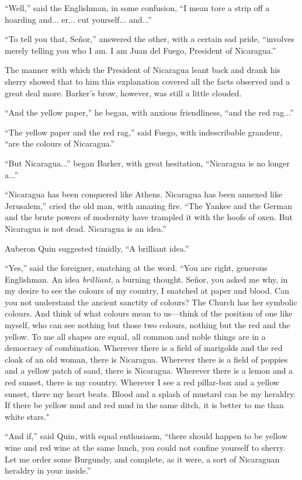 \documentclass{book}
\begin{document}
“Well,” said the Englishman, in some confusion, “I mean tore a strip off a hoarding and... er... cut yourself... and...”

“To tell you that, Señor,” answered the other, with a certain sad pride, “involves merely telling you who I am. I am Juan del Fuego, President of Nicaragua.”

The manner with which the President of Nicaragua leant back and drank his sherry showed that to him this explanation covered all the facts observed and a great deal more. Barker’s brow, however, was still a little clouded.

“And the yellow paper,” he began, with anxious friendliness, “and the red rag...”

“The yellow paper and the red rag,” said Fuego, with indescribable grandeur, “are the colours of Nicaragua.”

“But Nicaragua...” began Barker, with great hesitation, “Nicaragua is no longer a...”

“Nicaragua has been conquered like Athens. Nicaragua has been annexed like Jerusalem,” cried the old man, with amazing fire. “The Yankee and the German and the brute powers of modernity have trampled it with the hoofs of oxen. But Nicaragua is not dead. Nicaragua is an idea.”

Auberon Quin suggested timidly, “A brilliant idea.”

“Yes,” said the foreigner, snatching at the word. “You are right, generous Englishman. An idea \emph{brilliant}, a burning thought. Señor, you asked me why, in my desire to see the colours of my country, I snatched at paper and blood. Can you not understand the ancient sanctity of colours? The Church has her symbolic colours. And think of what colours mean to us—think of the position of one like myself, who can see nothing but those two colours, nothing but the red and the yellow. To me all shapes are equal, all common and noble things are in a democracy of combination. Wherever there is a field of marigolds and the red cloak of an old woman, there is Nicaragua. Wherever there is a field of poppies and a yellow patch of sand, there is Nicaragua. Wherever there is a lemon and a red sunset, there is my country. Wherever I see a red pillar-box and a yellow sunset, there my heart beats. Blood and a splash of mustard can be my heraldry. If there be yellow mud and red mud in the same ditch, it is better to me than white stars."

“And if,” said Quin, with equal enthusiasm, “there should happen to be yellow wine and red wine at the same lunch, you could not confine yourself to sherry. Let me order some Burgundy, and complete, as it were, a sort of Nicaraguan heraldry in your inside.”
\end{document}

